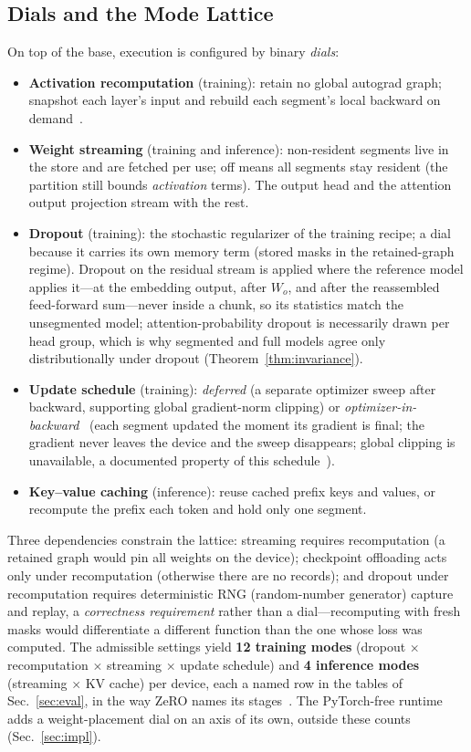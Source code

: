 \documentclass[journal]{IEEEtran}
\begin{document}
\subsection{Dials and the Mode Lattice}\label{sec:modes}
On top of the base, execution is configured by binary \emph{dials}:
\begin{itemize}
\item \textbf{Activation recomputation} (training): retain no global autograd
  graph; snapshot each layer's input and rebuild each segment's local
  backward on demand~\cite{chen2016training}.
\item \textbf{Weight streaming} (training and inference): non-resident
  segments live in the store and are fetched per use; off means all segments
  stay resident (the partition still bounds \emph{activation} terms). The
  output head and the attention output projection stream with the rest.
\item \textbf{Dropout} (training): the stochastic regularizer of the training
  recipe; a dial because it carries its own memory term (stored masks in the
  retained-graph regime). Dropout on the residual stream is applied where
  the reference model applies it---at the embedding output, after $W_o$,
  and after the reassembled feed-forward sum---never inside a chunk, so its
  statistics match the unsegmented model; attention-probability dropout is
  necessarily drawn per head group, which is why segmented and full models
  agree only distributionally under dropout
  (Theorem~\ref{thm:invariance}).
\item \textbf{Update schedule} (training): \emph{deferred} (a separate
  optimizer sweep after backward, supporting global gradient-norm clipping)
  or \emph{optimizer-in-backward}~\cite{lv2024lomo} (each segment updated the
  moment its gradient is final; the gradient never leaves the device and the
  sweep disappears; global clipping is unavailable, a documented property of
  this schedule~\cite{lv2024lomo}).
\item \textbf{Key--value caching} (inference): reuse cached prefix keys and
  values, or recompute the prefix each token and hold only one segment.
\end{itemize}
Three dependencies constrain the lattice: streaming requires recomputation
(a retained graph would pin all weights on the device); checkpoint
offloading acts only under recomputation (otherwise there are no records);
and dropout under recomputation requires deterministic RNG (random-number generator) capture and
replay, a \emph{correctness requirement} rather than a dial---recomputing
with fresh masks would differentiate a different function than the one whose
loss was computed. The admissible settings yield \textbf{12 training modes}
(dropout $\times$ recomputation $\times$ streaming $\times$ update schedule)
and \textbf{4 inference modes} (streaming $\times$ KV cache) per device,
each a named row in the tables of Sec.~\ref{sec:eval}, in the way ZeRO names its
stages~\cite{rajbhandari2020zero}. The PyTorch-free runtime adds a
weight-placement dial on an axis of its own, outside these counts
(Sec.~\ref{sec:impl}).
\end{document}
